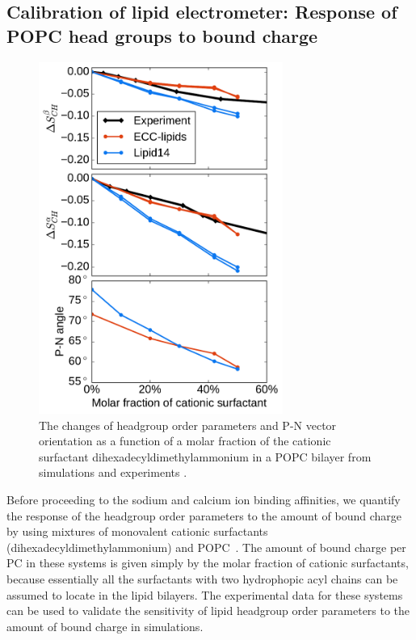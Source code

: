 \documentclass[aip,jcp,twocolumn]{revtex4}
\begin{document}

\subsection{Calibration of lipid electrometer:
            Response of POPC head groups to bound charge}\label{section:boundCHARGE}

\begin{figure}[tb!]
  \centering
  \includegraphics[width=8.0cm]{../Fig/ipython_nb/PN_angle_OrdPars-A-B_L14-ECCL17_q80_sig89_surf.pdf}
  \caption{\label{OrderParameterCHANGESsurf}
    The changes of headgroup order parameters and P-N vector orientation as a function of
    a molar fraction of the cationic surfactant dihexadecyldimethylammonium in a POPC bilayer
    from simulations and experiments \cite{scherer89}.
  }
\end{figure}

Before proceeding to the sodium and calcium  ion binding affinities, we quantify
the response of the headgroup order parameters to the amount of 
bound charge by using mixtures of monovalent cationic
surfactants (dihexadecyldimethylammonium)
and POPC~\cite{scherer89}. The amount of bound charge per PC 
in these systems is given simply by the molar fraction of cationic 
surfactants, because essentially all the surfactants with two hydrophopic
acyl chains can be assumed to locate in the lipid bilayers.
The experimental data for these systems can be used to validate 
the sensitivity of lipid headgroup order parameters
to the amount of bound charge in simulations.
\end{document}
